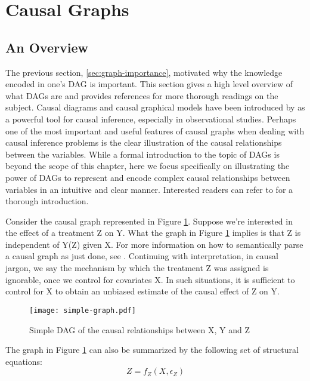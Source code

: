\section{Causal Graphs}

\subsection{An Overview}
\label{sec:graph-overview}
The previous section, \ref{sec:graph-importance}, motivated why the knowledge encoded in one's DAG is important.
This section gives a high level overview of what DAGs are and provides references for more thorough readings on the subject.
Causal diagrams and causal graphical models have been introduced by \citet{pearl_1995_causal} as a powerful tool for causal inference, especially in observational studies.
Perhaps one of the most important and useful features of causal
graphs when dealing with causal inference problems is the clear illustration
of the causal relationships between the variables.
While a formal introduction to the topic of DAGs is beyond the scope of this chapter,
here we focus specifically on illustrating the power of DAGs to represent
and encode complex causal relationships between variables in an intuitive and
clear manner.
Interested readers can refer to \citet{pearl_causality_2000} for a thorough introduction.

Consider the causal graph represented in Figure \ref{fig:simple-graph}.
Suppose we're interested in the effect of a treatment Z on Y.
What the graph in Figure \ref{fig:simple-graph} implies is that Z is
independent of Y(Z) given X.
For more information on how to semantically parse a causal graph as just done, see \citet[Ch 11.1]{pearl_2009_causality}.
Continuing with interpretation, in causal jargon, we say the mechanism by which the treatment Z was assigned is ignorable, once we control for covariates X.
In such situations, it is sufficient to control for X to obtain an unbiased estimate of the causal effect of Z on Y.

\begin{figure}[h!]
   \centering
   \texttt{[image: simple-graph.pdf]}
   \caption{Simple DAG of the causal relationships between X, Y and Z}
   \label{fig:simple-graph}
\end{figure}

The graph in Figure \ref{fig:simple-graph} can also be summarized by the following set of structural equations:
\[Z = f_Z(X, \epsilon_Z)  \]


